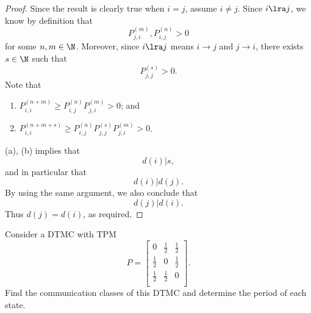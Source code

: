 \documentclass[stat333]{subfiles}
\begin{document}
    \begin{proof}
        Since the result is clearly true when $i=j$, assume $i\neq j$. Since $i\lra j$, we know by definition that
        \begin{equation*}
            P^{\left( m \right)}_{j,i}, P^{\left( n \right)}_{i,j}>0
        \end{equation*}
        for some $n,m\in\N$. Moreover, since $i\lra j$ means $i\to j$ and $j\to i$, there exists $s\in\N$ such that
        \begin{equation*}
            P_{j,j}^{\left( s \right)}>0.
        \end{equation*}
        Note that 
        \begin{enumerate}
            \item $P_{i,i}^{\left( n+m \right)} \geq P^{\left( n \right)}_{i,j}P^{\left( m \right)}_{j,i} > 0$; and
            \item $P_{i,i}^{\left( n+m+s \right)} \geq P^{\left( n \right)}_{i,j}P^{\left( s \right)}_{j,j}P^{\left( m \right)}_{j,i} > 0$.
        \end{enumerate}
        (a), (b) implies that
        \begin{equation*}
            d\left( i \right)|s,
        \end{equation*}
        and in particular that
        \begin{equation*}
            d\left( i \right)|d\left( j \right).
        \end{equation*}
        By using the same argument, we also conclude that
        \begin{equation*}
            d\left( j \right)|d\left( i \right).
        \end{equation*}
        Thus $d\left( j \right)=d\left( i \right)$, as required.
    \end{proof}

    \ex Consider a DTMC with TPM
    \begin{equation*}
        P =
        \begin{bmatrix}
        	0 & \frac{1}{2} & \frac{1}{2} \\
        	\frac{1}{2} & 0 & \frac{1}{2} \\
        	\frac{1}{2} & \frac{1}{2} & 0 \\
        \end{bmatrix}.
    \end{equation*}
    Find the communication classes of this DTMC and determine the period of each state.
\end{document}
